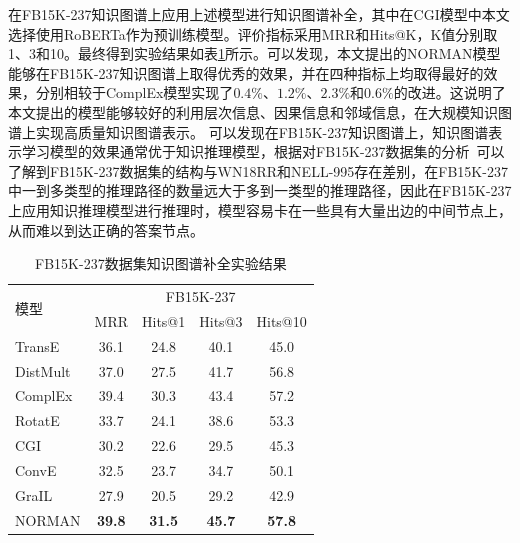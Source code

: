 \documentclass[algorithmlist, AutoFakeBold, AutoFakeSlant, figurelist, tablelist, nomlist, engineering]{seuthesix}
\begin{document}
在FB15K-237知识图谱上应用上述模型进行知识图谱补全，其中在CGI模型中本文选择使用RoBERTa作为预训练模型。评价指标采用MRR和Hits@K，K值分别取1、3和10。最终得到实验结果如表\ref{Experiment1_FB15K-237}所示。可以发现，本文提出的NORMAN模型能够在FB15K-237知识图谱上取得优秀的效果，并在四种指标上均取得最好的效果，分别相较于ComplEx模型实现了$0.4\%$、$1.2\%$、$2.3\%$和$0.6\%$的改进。这说明了本文提出的模型能够较好的利用层次信息、因果信息和邻域信息，在大规模知识图谱上实现高质量知识图谱表示。
可以发现在FB15K-237知识图谱上，知识图谱表示学习模型的效果通常优于知识推理模型，根据对FB15K-237数据集的分析~\cite{wan2021reasoning}可以了解到FB15K-237数据集的结构与WN18RR和NELL-995存在差别，在FB15K-237中一到多类型的推理路径的数量远大于多到一类型的推理路径，因此在FB15K-237上应用知识推理模型进行推理时，模型容易卡在一些具有大量出边的中间节点上，从而难以到达正确的答案节点。
\begin{table}[]
  \centering
  \begin{tabular*}{0.95\textwidth}{@{\extracolsep{\fill}}lcccc}
  \toprule[1pt]
  \multirow{2}{*}{模型} & \multicolumn{4}{c}{FB15K-237} \\
    & MRR & Hits@1 & Hits@3 & Hits@10 \\ \hline
  TransE & 36.1 & 24.8 & 40.1 & 45.0 \\
  DistMult & 37.0 & 27.5 & 41.7 & 56.8 \\
  ComplEx & 39.4 & 30.3 & 43.4 & 57.2 \\
  RotatE & 33.7 & 24.1 & 38.6  & 53.3 \\
  CGI & 30.2 & 22.6 & 29.5 & 45.3 \\
  ConvE & 32.5 & 23.7 & 34.7 & 50.1 \\
  GraIL & 27.9 & 20.5 & 29.2 & 42.9 \\
  NORMAN & \textbf{39.8} & \textbf{31.5} & \textbf{45.7} & \textbf{57.8} \\
  \bottomrule[1pt]
  \end{tabular*}
  \caption{FB15K-237数据集知识图谱补全实验结果}
  \label{Experiment1_FB15K-237}
\end{table}
\end{document}
